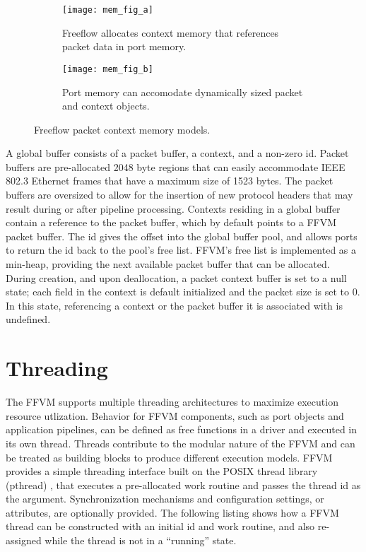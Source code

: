 \begin{figure}[h]
  \centering
  \begin{subfigure}[b]{0.48\textwidth}
    \centering
    \texttt{[image: mem\_fig\_a]}
    \caption{Freeflow allocates context memory that references packet data
    in port memory.}
  \end{subfigure}
  \hfill
  \begin{subfigure}[b]{0.48\textwidth}
    \centering
    \texttt{[image: mem\_fig\_b]}
    \caption{Port memory can accomodate dynamically sized packet and context
    objects.}
  \end{subfigure}
  \caption{Freeflow packet context memory models.}
  \label{mem_model}
\end{figure}

A global buffer consists of a packet buffer, a context, and a non-zero
id. Packet buffers are pre-allocated 2048 byte regions that can easily
accommodate IEEE 802.3 Ethernet frames that have a maximum size of 1523 bytes.
The packet buffers are oversized to allow for the insertion of new protocol
headers that may result during or after pipeline processing. Contexts residing
in a global buffer contain a reference to the packet buffer, which by default
points to a FFVM packet buffer. The id gives the offset into the global buffer
pool, and allows ports to return the id back to the pool's free list. FFVM's
free list is implemented as a min-heap, providing the next available packet
buffer that can be allocated. During creation, and upon deallocation, a packet
context buffer is set to a null state; each field in the context is default
initialized and the packet size is set to 0. In this state, referencing a
context or the packet buffer it is associated with is undefined.

\section{Threading}
\label{vm:threading}
The FFVM supports multiple threading architectures to maximize execution
resource utlization. Behavior for FFVM components, such as port objects and
application pipelines, can be defined as free functions in a driver and
executed in its own thread. Threads contribute to the modular nature of the
FFVM and can be treated as building blocks to produce different execution
models. FFVM provides a simple threading interface built on the POSIX thread
library (pthread) \cite{pthread}, that executes a pre-allocated work routine
and passes the thread id as the argument. Synchronization mechanisms and
configuration settings, or attributes, are optionally provided. The following
listing shows how a FFVM thread can be constructed with an initial id and work
routine, and also re-assigned while the thread is not in a ``running'' state.

